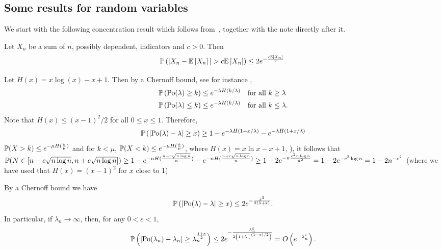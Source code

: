 \begin{appendices}
\section{Some results for random variables}

We start with the following concentration result which follows from~\cite[Theorem 4]{freedman1973another}, together with the note directly after it.

\begin{lemma}\label{lem:general_concentration_sum_indicators}
Let $X_n$ be a sum of $n$, possibly dependent, indicators and $c > 0$. Then
\[
	\mathbb{P}\left(|X_n - \mathbb{E}\left[X_n\right]| > c \mathbb{E}\left[X_n\right]\right) \le 2 e^{-\frac{c \mathbb{E}\left[X_n\right]}{2}}.
\]
\end{lemma}

Let $H(x) = x\log(x) - x + 1$. Then by a Chernoff bound, see for instance \cite[Lemma 1.2]{penrose2003random},
\begin{align*}
	&\mathbb{P}\left({\mathrm{Po}}(\lambda) \ge k\right) \le e^{-\lambda H(k/\lambda)} \quad \text{for all } k \ge \lambda\\
	&\mathbb{P}\left({\mathrm{Po}}(\lambda) \le k\right) \le e^{-\lambda H(k/\lambda)} \quad \text{for all } k \le \lambda.
\end{align*}
Note that $H(x) \le (x-1)^2/2$ for all $0 \le x \le 1$. Therefore, 
\begin{align*}
	\mathbb{P}\left(\left|\mathrm{Po}(\lambda) - \lambda\right| \ge x\right) \ge 1 - e^{-\lambda H(1 - x/\lambda)} - e^{-\lambda H(1 + x/\lambda)}
\end{align*}
 $\mathbb{P}(X >k) \leq e^{-\mu H(\frac{k}{\mu})}$ and for $k<\mu$, $\mathbb{P}(X< k) \leq e^{-\mu H(\frac{k}{\mu})}$, where $H(x) = x\ln x -x+1$, \cite{penrose2003random}), it follows that $\mathbb{P}(N \in [n-c\sqrt{n\log n},n+c\sqrt{n\log n}]) \geq 1-e^{-n H(\frac{n-c\sqrt{n\log n}}{n})}-e^{-nH(\frac{n+c\sqrt{n \log n}}{n})} \geq  1-2e^{-n \frac{c^2 n \log n}{n^2}} = 1-2e^{-c^2\log n}=1-2n^{-c^2}$ (where we have used that $H(x) = (x-1)^2$ for $x$ close to 1)

By a Chernoff bound we have
\begin{equation}\label{eq:def_chernoff_bound_poisson}
	\mathbb{P}\left(\left|\mathrm{Po}(\lambda) - \lambda\right| \ge x\right) \le 2e^{-\frac{x^2}{2(\lambda + x)}}.
\end{equation}
In particular, if $\lambda_n \to \infty$, then, for any $0 < \varepsilon < 1$,
\[
	\mathbb{P}\left(\left|\mathrm{Po}(\lambda_n) - \lambda_n\right| \ge \lambda_n^{\frac{1+\varepsilon}{2}}\right) \le 2e^{-\frac{\lambda_n^\varepsilon}{2\left(1 + \lambda_n^{-(1 - \varepsilon)/2}\right)}}
	= O\left(e^{-\lambda_n^\varepsilon}\right).
\]


\end{appendices}
